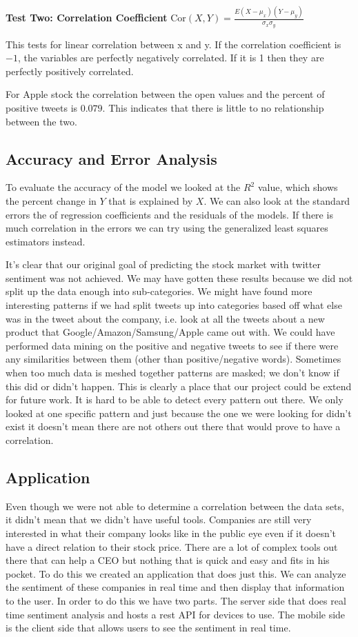 \documentclass{acm_proc_article-sp}
\begin{document}
\textbf{Test Two: Correlation Coefficient}
Cor$(X,Y) = \frac{E ( X - \mu_x)(Y - \mu_y)}{\sigma_x\sigma_y}$


This tests for linear correlation between x and y. If the correlation
coefficient is $-1$, the variables are perfectly negatively correlated. If
it is 1 then they are perfectly positively correlated.  

For Apple stock the correlation between the open values and the percent of positive
tweets is $0.079 $. This indicates that there is little to no relationship
between the two. 

\subsection{Accuracy and Error Analysis}
To evaluate the accuracy of the model we looked at the $R^2$ value, which shows
the percent change in $Y$ that is explained by $X$. We can also look at the
standard errors the of regression coefficients and the residuals of the models.
If there is much correlation in the errors we can try using the generalized
least squares estimators instead. 

It's clear that our original goal of predicting the stock market with twitter sentiment 
was not achieved. We may have gotten these results because we did not split up the data 
enough into sub-categories. We might have found more interesting patterns if we had split tweets
up into categories based off what else was in the tweet about the company, i.e. look at all the
tweets about a new product that Google/Amazon/Samsung/Apple came out with. We could have performed data mining
on the positive and negative tweets to see if there were any similarities between them (other 
than positive/negative words). Sometimes when too much data is meshed together patterns are masked;
we don't know if this did or didn't happen. This is clearly a place that our project could be extend for future work.
It is hard to be able to detect every pattern out there. We only looked at one specific pattern and just because
the one we were looking for didn't exist it doesn't mean there are not others out there that would prove to have a correlation.  

\subsection{Application}

Even though we were not able to determine a correlation between the data sets, it
didn't mean that we didn't have useful tools. Companies are still very
interested in what their company looks like in the public eye even if it
doesn't have a direct relation to their stock price. There are a lot of complex
tools out there that can help a CEO but nothing that is quick and easy and fits
in his pocket. To do this we created an application that does just this. We can
analyze the sentiment of these companies in real time and then display that
information to the user. In order to do this we have two parts. The server side
that does real time sentiment analysis and hosts a rest API for devices to use.
The mobile side is the client side that allows users to see the sentiment in
real time.
\end{document}
